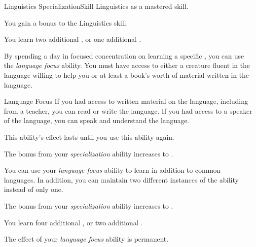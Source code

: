     \begin{feat}{Linguistics Specialization}{Skill}
        \featpre Linguistics as a mastered skill.

         You gain a  bonus to the Linguistics skill.

         You learn two additional , or one additional .

         By spending a day in focused concentration on learning a specific , you can use the \textit{language focus} ability.
        You must have access to either a creature fluent in the language willing to help you or at least a book's worth of material written in the language.
        \begin{freeability}{Language Focus}
            If you had access to written material on the language, including from a teacher, you can read or write the language.
            If you had access to a speaker of the language, you can speak and understand the language.

            This ability's effect lasts until you use this ability again.
        \end{freeability}

         The bonus from your \textit{specialization} ability increases to .

         You can use your \textit{language focus} ability to learn  in addition to common languages.
        In addition, you can maintain two different instances of the ability instead of only one.

         The bonus from your \textit{specialization} ability increases to .

         You learn four additional , or two additional .

         The effect of your \textit{language focus} ability is permanent.
    \end{feat}

